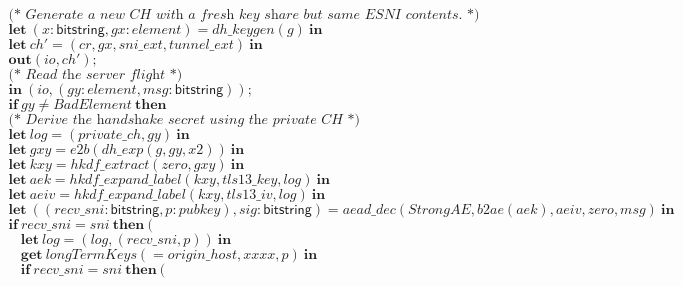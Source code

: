 \documentclass{article}
\theoremstyle{definition}
\newcommand{\kwl}[1]{\mathbf{#1}}
\newcommand{\kwt}[1]{\mathsf{#1}}
\newcommand{\var}[1]{\mathit{#1}}
\theoremstyle{definition}
\begin{document}
\begin{tabbing}
$ $\\
$\ \ \ \ \ \textit{(* Generate a new CH with a fresh key share but same ESNI contents. *)} $\\
$\ \ \ \ \ \kwl{let}\ (\var{x}{:}\kwt{bitstring}, \var{gx}{:}\var{element}) = \var{dh{\_}keygen}(\var{g})\ \kwl{in} $\\
$\ \ \ \ \ \kwl{let}\ \var{ch'} = (\var{cr}, \var{gx}, \var{sni{\_}ext}, \var{tunnel{\_}ext})\ \kwl{in} $\\
$\ \ \ \ \ \kwl{out}(\var{io}, \var{ch'}); $\\
$ $\\
$\ \ \ \ \ \textit{(* Read the server flight *)} $\\
$\ \ \ \ \ \kwl{in}\ (\var{io}, (\var{gy}{:}\var{element}, \var{msg}{:}\kwt{bitstring})); $\\
$ $\\
$\ \ \ \ \ \kwl{if}\ \var{gy}\neq\var{BadElement}\ \kwl{then} $\\
$ $\\
$\ \ \ \ \ \textit{(* Derive the handshake secret using the private CH *)} $\\
$\ \ \ \ \ \kwl{let}\ \var{log} = (\var{private{\_}ch}, \var{gy})\ \kwl{in} $\\
$\ \ \ \ \ \kwl{let}\ \var{gxy} = \var{e2b}(\var{dh{\_}exp}(\var{g}, \var{gy}, \var{x2}))\ \kwl{in} $\\
$\ \ \ \ \ \kwl{let}\ \var{kxy} = \var{hkdf{\_}extract}(\var{zero}, \var{gxy})\ \kwl{in} $\\
$\ \ \ \ \ \kwl{let}\ \var{aek} = \var{hkdf{\_}expand{\_}label}(\var{kxy}, \var{tls13{\_}key}, \var{log})\ \kwl{in} $\\
$\ \ \ \ \ \kwl{let}\ \var{aeiv} = \var{hkdf{\_}expand{\_}label}(\var{kxy}, \var{tls13{\_}iv}, \var{log})\ \kwl{in} $\\
$\ \ \ \ \  $\\
$\ \ \ \ \ \kwl{let}\ ((\var{recv{\_}sni}{:}\kwt{bitstring}, \var{p}{:}\var{pubkey}), \var{sig}{:}\kwt{bitstring}) = \var{aead{\_}dec}(\var{StrongAE}, \var{b2ae}(\var{aek}), \var{aeiv}, \var{zero}, \var{msg})\ \kwl{in} $\\
$\ \ \ \ \ \kwl{if}\ \var{recv{\_}sni} = \var{sni}\ \kwl{then}\ ( $\\
$\ \ \ \ \ \ \ \ \ \kwl{let}\ \var{log} = (\var{log}, (\var{recv{\_}sni}, \var{p}))\ \kwl{in} $\\
$\ \ \ \ \ \ \ \ \ \kwl{get}\ \var{longTermKeys}( = \var{origin{\_}host}, \var{xxxx}, \var{p})\ \kwl{in} $\\
$\ \ \ \ \ \ \ \ \ \kwl{if}\ \var{recv{\_}sni} = \var{sni}\ \kwl{then}\ ( $\\

\end{tabbing}
\end{document}
